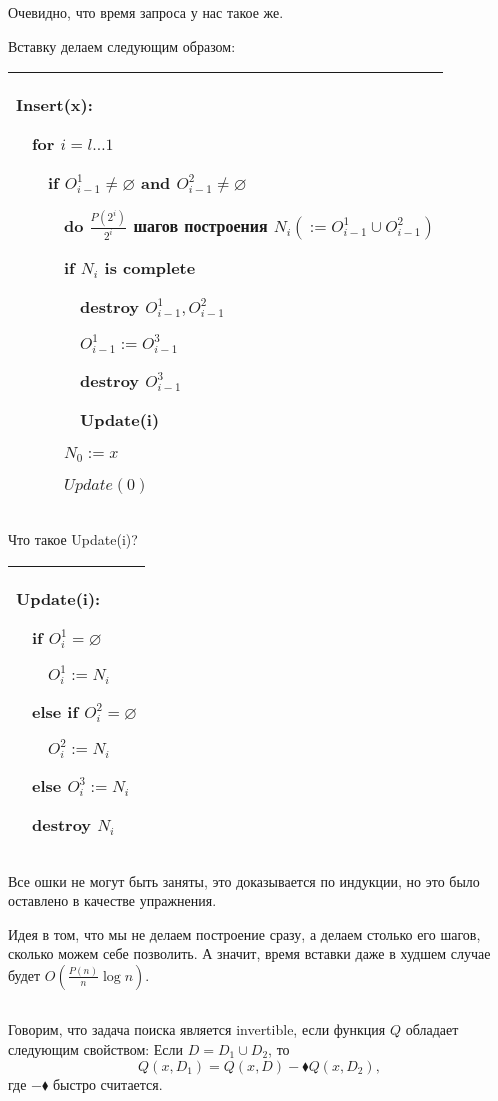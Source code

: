 Очевидно, что время запроса у нас такое же.

Вставку делаем следующим образом:

\begin{tabular}{|p{9cm}|}
\hline
Insert(x):

$\quad$for $i=l \ldots 1$

$\quad$$\quad$if $O^1_{i-1} \ne \varnothing$ and $O^2_{i-1} \ne \varnothing$

$\quad$$\quad$$\quad$do $\frac{P(2^i)}{2^i}$ шагов построения $N_i(:=O^1_{i-1}\cup O_{i-1}^2)$

$\quad$$\quad$$\quad$if $N_i$ is complete

$\quad$$\quad$$\quad$$\quad$destroy $O_{i-1}^1,O_{i-1}^2$

$\quad$$\quad$$\quad$$\quad$$O^1_{i-1}:=O_{i-1}^3$

$\quad$$\quad$$\quad$$\quad$destroy $O_{i-1}^3$


$\quad$$\quad$$\quad$$\quad$Update(i)

$\quad$$\quad$$\quad$$N_0:=x$

$\quad$$\quad$$\quad$$Update(0)$\\

\hline
\end{tabular}

Что такое Update(i)?

\begin{tabular}{|p{3cm}|}
\hline
Update(i):

$\quad$if $O^1_i=\varnothing$

$\quad$$\quad$$O^1_i:=N_i$

$\quad$else if $O_i^2 = \varnothing$

$\quad$$\quad$$O_i^2:=N_i$

$\quad$else $O_i^3:=N_i$

$\quad$destroy $N_i$\\

\hline
\end{tabular}






Все ошки не могут быть заняты, это доказывается по индукции, но это было оставлено в качестве упражнения.

Идея в том, что мы не делаем построение сразу, а делаем столько его шагов, сколько можем себе позволить. А значит, время вставки даже в худшем случае будет $O\left(\frac{P(n)}{n}\log n\right)$.

\subsection{}
\begin{definition}
Говорим, что задача поиска является invertible, если функция $Q$ обладает следующим свойством:
Если $D=D_1\cup D_2$, то
$$Q(x,D_1)=Q(x,D)-\blacklozenge Q(x,D_2),$$
где $-\blacklozenge$ быстро считается.
\end{definition}

